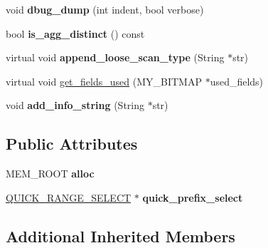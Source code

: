 \begin{DoxyCompactItemize}
\mbox{\label{classQUICK__GROUP__MIN__MAX__SELECT_a5e0702259b8d58947d36bc0af71a3bfb}} 
void {\bfseries dbug\+\_\+dump} (int indent, bool verbose)
\item 
\mbox{\label{classQUICK__GROUP__MIN__MAX__SELECT_a947c450641d1bf06647d4516f8ba47b0}} 
bool {\bfseries is\+\_\+agg\+\_\+distinct} () const
\item 
\mbox{\label{classQUICK__GROUP__MIN__MAX__SELECT_a630339cbccacc70c8b465554c7605bc3}} 
virtual void {\bfseries append\+\_\+loose\+\_\+scan\+\_\+type} (String $\ast$str)
\item 
virtual void \mbox{\hyperlink{classQUICK__GROUP__MIN__MAX__SELECT_ae4876e3c96dbe364e3b27fda1c6ae877}{get\+\_\+fields\+\_\+used}} (M\+Y\+\_\+\+B\+I\+T\+M\+AP $\ast$used\+\_\+fields)
\item 
\mbox{\label{classQUICK__GROUP__MIN__MAX__SELECT_a608d302ed86c9df4f0b6ff80488f8125}} 
void {\bfseries add\+\_\+info\+\_\+string} (String $\ast$str)
\end{DoxyCompactItemize}
\subsection*{Public Attributes}
\begin{DoxyCompactItemize}
\item 
\mbox{\label{classQUICK__GROUP__MIN__MAX__SELECT_af20e7e466813fc6cc2fdd7eca2cdc9bc}} 
M\+E\+M\+\_\+\+R\+O\+OT {\bfseries alloc}
\item 
\mbox{\label{classQUICK__GROUP__MIN__MAX__SELECT_abddc4299d1ea8482ba455d176ec3f5db}} 
\mbox{\hyperlink{classQUICK__RANGE__SELECT}{Q\+U\+I\+C\+K\+\_\+\+R\+A\+N\+G\+E\+\_\+\+S\+E\+L\+E\+CT}} $\ast$ {\bfseries quick\+\_\+prefix\+\_\+select}
\end{DoxyCompactItemize}
\subsection*{Additional Inherited Members}


